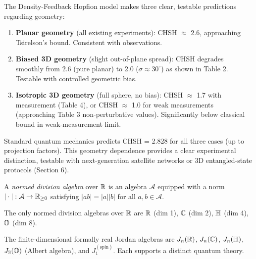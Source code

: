 The Density-Feedback Hopfion model makes three clear, testable predictions regarding geometry:

\begin{enumerate}
\item \textbf{Planar geometry} (all existing experiments): CHSH $\approx$ 2.6, approaching Tsirelson's bound. Consistent with observations.

\item \textbf{Biased 3D geometry} (slight out-of-plane spread): CHSH degrades smoothly from 2.6 (pure planar) to 2.0 ($\sigma \approx 30^\circ$) as shown in Table 2. Testable with controlled geometric bias.

\item \textbf{Isotropic 3D geometry} (full sphere, no bias): CHSH $\approx$ 1.7 with measurement (Table 4), or CHSH $\approx$ 1.0 for weak measurements (approaching Table 3 non-perturbative values). Significantly below classical bound in weak-measurement limit.
\end{enumerate}

Standard quantum mechanics predicts CHSH = 2.828 for all three cases (up to projection factors). This geometry dependence provides a clear experimental distinction, testable with next-generation satellite networks or 3D entangled-state protocols (Section 6).

\begin{definition}
\label{P9:def:normed_division_algebra}
A \emph{normed division algebra} over $\mathbb{R}$ is an algebra $\mathcal{A}$
equipped with a norm $|\cdot|:\mathcal{A}\to\mathbb{R}_{\geq0}$ satisfying
$|ab|=|a||b|$ for all $a,b\in\mathcal{A}$.
\end{definition}

\begin{theorem}
\label{P9:thm:hurwitz}
The only normed division algebras over $\mathbb{R}$ are
$\mathbb{R}$ (dim 1), $\mathbb{C}$ (dim 2), $\mathbb{H}$ (dim 4), $\mathbb{O}$ (dim 8).
\end{theorem}

\begin{theorem}
\label{P9:thm:jnw}
The finite-dimensional formally real Jordan algebras are
$J_n(\mathbb{R})$, $J_n(\mathbb{C})$, $J_n(\mathbb{H})$, $J_3(\mathbb{O})$ (Albert algebra),
and $J_1^{(\mathrm{spin})}$.
Each supports a distinct quantum theory.
\end{theorem}

